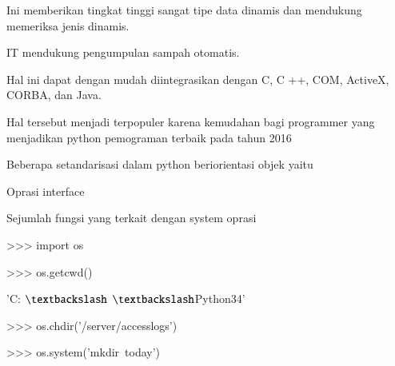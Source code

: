 \documentclass[a4paper,12pt]{report}
\begin{document}
\noindent 
{\fontsize{14pt}{14pt}\selectfont Ini memberikan tingkat tinggi sangat tipe data dinamis dan mendukung memeriksa jenis dinamis. \\} \par
\noindent 
{\fontsize{14pt}{14pt}\selectfont IT mendukung pengumpulan sampah otomatis. \\} \par
\noindent 
{\fontsize{14pt}{14pt}\selectfont Hal ini dapat dengan mudah diintegrasikan dengan C, C ++, COM, ActiveX, CORBA, dan Java. \\} \par
\noindent 
{\fontsize{14pt}{14pt}\selectfont Hal tersebut menjadi terpopuler karena kemudahan bagi programmer yang menjadikan python pemograman terbaik pada tahun 2016  \\} \par
\vspace{14pt}
\noindent 
{\fontsize{14pt}{14pt}\selectfont Beberapa setandarisasi dalam python beriorientasi objek yaitu \\} \par
\vspace{14pt}
\noindent 
{\fontsize{14pt}{14pt}\selectfont Oprasi interface \\} \par
\noindent 
{\fontsize{14pt}{14pt}\selectfont Sejumlah fungsi yang terkait dengan system oprasi \\} \par
\vspace{14pt}
\noindent 
{\fontsize{14pt}{14pt}\selectfont >>> import os \\} \par
\vspace{14pt}
\noindent 
{\fontsize{14pt}{14pt}\selectfont >>> os.getcwd()~~~~~  \\} \par
\noindent 
{\fontsize{14pt}{14pt}\selectfont 'C: $  \textbackslash  $ $  \textbackslash  $Python34' \\} \par
\vspace{14pt}
\noindent 
{\fontsize{14pt}{14pt}\selectfont >>> os.chdir('/server/accesslogs') \\} \par
\vspace{14pt}
\noindent 
{\fontsize{14pt}{14pt}\selectfont >>> os.system('mkdir~today')~   \\} \par
\noindent 
{\fontsize{14pt}{14pt} \\} \par
\end{document}
